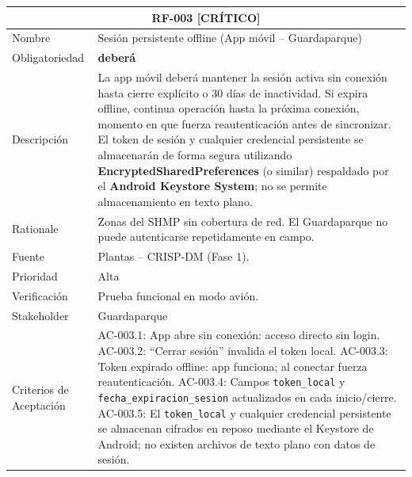 \documentclass[12pt, a4paper]{article}
\newcommand{\criticomark}{\textcolor{criticolor}{\textbf{[CR\'ITICO]}}}
\begin{document}
\newpage
\begin{longtable}{|p{3cm}|p{11.5cm}|}
\hline
\multicolumn{2}{|c|}{\textbf{RF-003} \criticomark} \\
\hline
Nombre & Sesi\'on persistente offline (App m\'ovil -- Guardaparque) \\
\hline
Obligatoriedad & \textbf{deber\'a} \\
\hline
Descripci\'on & La app m\'ovil deber\'a mantener la sesi\'on activa sin conexi\'on hasta cierre expl\'icito o 30 d\'ias de inactividad. Si expira offline, continua operaci\'on hasta la pr\'oxima conexi\'on, momento en que fuerza reautenticaci\'on antes de sincronizar. El token de sesi\'on y cualquier credencial persistente se almacenarán de forma segura utilizando \textbf{EncryptedSharedPreferences} (o similar) respaldado por el \textbf{Android Keystore System}; no se permite almacenamiento en texto plano. \\
\hline
Rationale & Zonas del SHMP sin cobertura de red. El Guardaparque no puede autenticarse repetidamente en campo. \\
\hline
Fuente & Plantas -- CRISP-DM (Fase 1). \\
\hline
Prioridad & Alta \\
\hline
Verificaci\'on & Prueba funcional en modo avi\'on. \\
\hline
Stakeholder & Guardaparque \\
\hline
Criterios de Aceptaci\'on &
AC-003.1: App abre sin conexi\'on: acceso directo sin login. \newline
AC-003.2: ``Cerrar sesi\'on'' invalida el token local. \newline
AC-003.3: Token expirado offline: app funciona; al conectar fuerza reautenticaci\'on. \newline
AC-003.4: Campos \texttt{token\_local} y \texttt{fecha\_expiracion\_sesion} actualizados en cada inicio/cierre. \newline
AC-003.5: El \texttt{token\_local} y cualquier credencial persistente se almacenan cifrados en reposo mediante el Keystore de Android; no existen archivos de texto plano con datos de sesi\'on. \\
\hline
\end{longtable}
\end{document}

